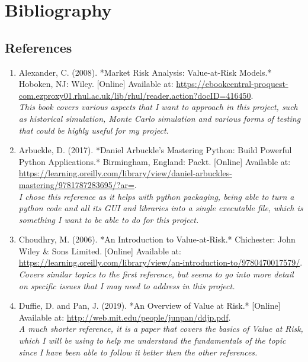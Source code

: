 \documentclass{article}
\begin{document}
\newpage
\section{Bibliography}
\subsection{References}
\begin{small}
\begin{enumerate}
  \item\label{ref1} Alexander, C. (2008). *Market Risk Analysis: Value-at-Risk Models.* Hoboken, NJ: Wiley. [Online] Available at: \url{https://ebookcentral-proquest-com.ezproxy01.rhul.ac.uk/lib/rhul/reader.action?docID=416450}.
  \\\textit{This book covers various aspects that I want to approach in this project, such as historical simulation, Monte Carlo simulation and various forms of testing that could be highly useful for my project.}
  
  \item\label{ref2} Arbuckle, D. (2017). *Daniel Arbuckle's Mastering Python: Build Powerful Python Applications.* Birmingham, England: Packt. [Online] Available at: \url{https://learning.oreilly.com/library/view/daniel-arbuckles-mastering/9781787283695/?ar=}.
  \\\textit{I chose this reference as it helps with python packaging, being able to turn a python code and all its GUI and libraries into a single executable file, which is something I want to be able to do for this project.}

  \item\label{ref3} Choudhry, M. (2006). *An Introduction to Value-at-Risk.* Chichester: John Wiley \& Sons Limited. [Online] Available at: \\ \url{https://learning.oreilly.com/library/view/an-introduction-to/9780470017579/}.
  \\\textit{Covers similar topics to the first reference, but seems to go into more detail on specific issues that I may need to address in this project.}
  
  \item\label{ref4} Duffie, D. and Pan, J. (2019). *An Overview of Value at Risk.* [Online] Available at: \url{http://web.mit.edu/people/junpan/ddjp.pdf}.
  \\\textit{A much shorter reference, it is a paper that covers the basics of Value at Risk, which I will be using to help me understand the fundamentals of the topic since I have been able to follow it better then the other references.}
  

\end{enumerate}
\end{small}
\end{document}
